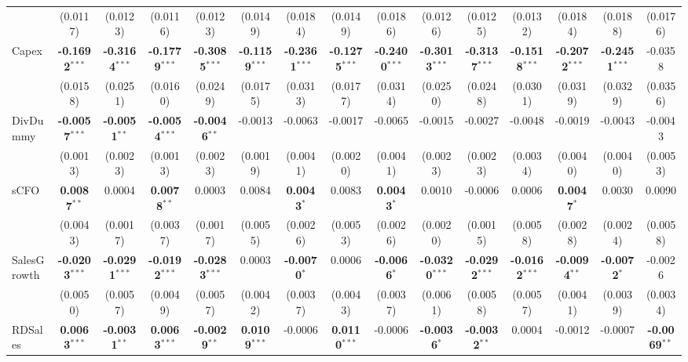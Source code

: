 \begin{landscape}
\begin{table}[H]
\begin{tabular}{lcccccccccccccc}
 & (0.0117) & (0.0123) & (0.0116) & (0.0123) & (0.0149) & (0.0184) & (0.0149) & (0.0186) & (0.0126) & (0.0125) & (0.0132) & (0.0184) & (0.0188) & (0.0176) \\
Capex & \textbf{-0.1692}$^{***}$ & \textbf{-0.3164}$^{***}$ & \textbf{-0.1779}$^{***}$ & \textbf{-0.3085}$^{***}$ & \textbf{-0.1159}$^{***}$ & \textbf{-0.2361}$^{***}$ & \textbf{-0.1275}$^{***}$ & \textbf{-0.2400}$^{***}$ & \textbf{-0.3013}$^{***}$ & \textbf{-0.3137}$^{***}$ & \textbf{-0.1518}$^{***}$ & \textbf{-0.2072}$^{***}$ & \textbf{-0.2451}$^{***}$ & -0.0358 \\
 & (0.0158) & (0.0251) & (0.0160) & (0.0249) & (0.0175) & (0.0313) & (0.0177) & (0.0314) & (0.0250) & (0.0248) & (0.0301) & (0.0319) & (0.0329) & (0.0356) \\
DivDummy & \textbf{-0.0057}$^{***}$ & \textbf{-0.0051}$^{**}$ & \textbf{-0.0054}$^{***}$ & \textbf{-0.0046}$^{**}$ & -0.0013 & -0.0063 & -0.0017 & -0.0065 & -0.0015 & -0.0027 & -0.0048 & -0.0019 & -0.0043 & -0.0043 \\
 & (0.0013) & (0.0023) & (0.0013) & (0.0023) & (0.0019) & (0.0041) & (0.0020) & (0.0041) & (0.0023) & (0.0023) & (0.0034) & (0.0040) & (0.0040) & (0.0053) \\
sCFO & \textbf{0.0087}$^{**}$ & 0.0004 & \textbf{0.0078}$^{**}$ & 0.0003 & 0.0084 & \textbf{0.0043}$^{*}$ & 0.0083 & \textbf{0.0043}$^{*}$ & 0.0010 & -0.0006 & 0.0006 & \textbf{0.0047}$^{*}$ & 0.0030 & 0.0090 \\
 & (0.0043) & (0.0017) & (0.0037) & (0.0017) & (0.0055) & (0.0026) & (0.0053) & (0.0026) & (0.0020) & (0.0015) & (0.0058) & (0.0028) & (0.0024) & (0.0058) \\
SalesGrowth & \textbf{-0.0203}$^{***}$ & \textbf{-0.0291}$^{***}$ & \textbf{-0.0192}$^{***}$ & \textbf{-0.0283}$^{***}$ & 0.0003 & \textbf{-0.0070}$^{*}$ & 0.0006 & \textbf{-0.0066}$^{*}$ & \textbf{-0.0320}$^{***}$ & \textbf{-0.0292}$^{***}$ & \textbf{-0.0162}$^{***}$ & \textbf{-0.0094}$^{**}$ & \textbf{-0.0072}$^{*}$ & -0.0026 \\
 & (0.0050) & (0.0057) & (0.0049) & (0.0057) & (0.0042) & (0.0037) & (0.0043) & (0.0037) & (0.0061) & (0.0058) & (0.0057) & (0.0041) & (0.0039) & (0.0034) \\
RDSales & \textbf{0.0063}$^{***}$ & \textbf{-0.0031}$^{**}$ & \textbf{0.0063}$^{***}$ & \textbf{-0.0029}$^{**}$ & \textbf{0.0109}$^{***}$ & -0.0006 & \textbf{0.0110}$^{***}$ & -0.0006 & \textbf{-0.0036}$^{*}$ & \textbf{-0.0032}$^{**}$ & 0.0004 & -0.0012 & -0.0007 & \textbf{-0.0069}$^{**}$ \\

\end{tabular}
\end{table}
\end{landscape}
